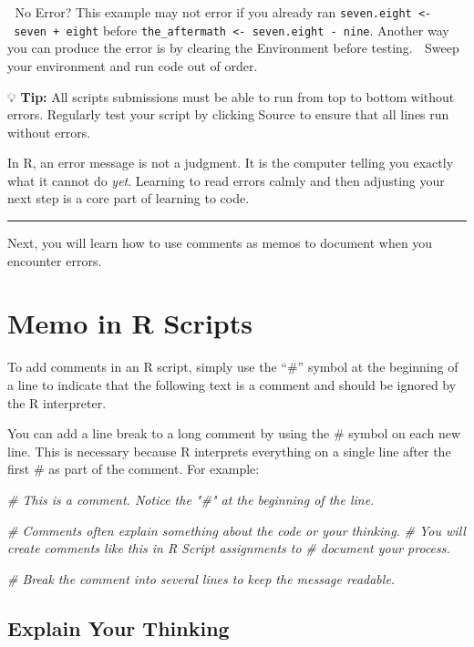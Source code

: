 \documentclass[
  12pt,
]{scrreprt}
\newenvironment{Shaded}{\begin{snugshade}}{\end{snugshade}}
\newcommand{\CommentTok}[1]{\textcolor[rgb]{0.56,0.35,0.01}{\textit{#1}}}
\begin{document}
🤔 No Error? This example may not error if you already ran
\texttt{seven.eight\ \textless{}-\ seven\ +\ eight} before
\texttt{the\_aftermath\ \textless{}-\ seven.eight\ -\ nine}. Another way
you can produce the error is by clearing the Environment before testing.
🧹 Sweep your environment and run code out of order.

💡 \textbf{Tip:} All scripts submissions must be able to run from top to
bottom without errors. Regularly test your script by clicking Source to
ensure that all lines run without errors.

In R, an error message is not a judgment. It is the computer telling you
exactly what it cannot do \emph{yet}. Learning to read errors calmly and
then adjusting your next step is a core part of learning to code.

\begin{center}\rule{0.5\linewidth}{0.5pt}\end{center}

Next, you will learn how to use comments as memos to document when you
encounter errors.

\chapter{Memo in R Scripts}\label{memo-in-r-scripts}

To add comments in an R script, simply use the ``\#'' symbol at the
beginning of a line to indicate that the following text is a comment and
should be ignored by the R interpreter.

You can add a line break to a long comment by using the \# symbol on
each new line. This is necessary because R interprets everything on a
single line after the first \# as part of the comment. For example:

\begin{Shaded}
\begin{Highlighting}[]
\CommentTok{\# This is a comment. Notice the "\#" at the beginning of the line.}

\CommentTok{\# Comments often explain something about the code or your thinking.}
\CommentTok{\# You will create comments like this in R Script assignments to }
\CommentTok{\#  document your process.}

\CommentTok{\# Break the comment into several lines to keep the message readable.}
\end{Highlighting}
\end{Shaded}

\section{Explain Your Thinking}\label{explain-your-thinking}
\end{document}
